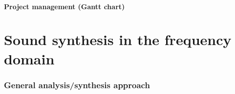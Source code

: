 \documentclass[]{article}
\begin{document}
\subsection{Project management (Gantt chart)}
\begin{figure}[H]
	\centering
\end{figure}

\newpage
\part{Sound synthesis in the frequency domain}
\section{General analysis/synthesis approach}\label{part:general-approach}
\end{document}
